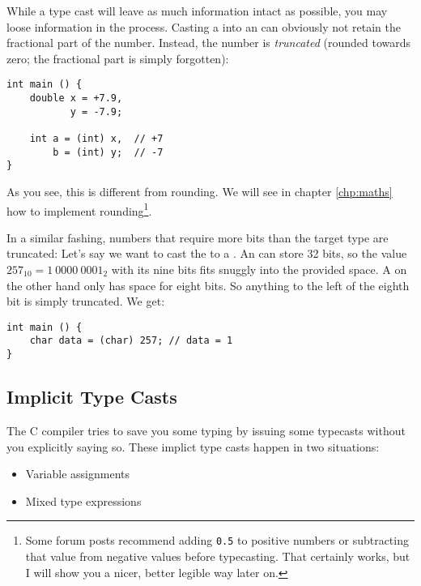 {While a type cast will leave as much information intact as possible, you may loose information in the process. Casting a  into an  can obviously not retain the fractional part of the number. Instead, the number is \emph{truncated} (rounded towards zero; the fractional part is simply forgotten):

\begin{codebox}
\begin{verbatim}
int main () {
    double x = +7.9,
           y = -7.9;

    int a = (int) x,  // +7
        b = (int) y;  // -7
}
\end{verbatim}
\end{codebox}

As you see, this is different from rounding. We will see in chapter \ref{chp:maths} how to implement rounding\footnote{Some forum posts recommend adding \texttt{0.5} to positive numbers or subtracting that value from negative values before typecasting. That certainly works, but I will show you a nicer, better legible way later on.}.

In a similar fashing, numbers that require more bits than the target type are truncated: Let's say we want to cast the  to a . An  can store 32 bits, so the value $257_{10} = 1~0000~0001_2$ with its nine bits fits snuggly into the provided space. A  on the other hand only has space for eight bits. So anything to the left of the eighth bit is simply truncated. We get:

\begin{codebox}
\begin{verbatim}
int main () {
    char data = (char) 257; // data = 1
}
\end{verbatim}
\end{codebox}

\subsection{Implicit Type Casts}
The C compiler tries to save you some typing by issuing some typecasts without you explicitly saying so. These implict type casts happen in two situations:
\begin{itemize}
\item Variable assignments
\item Mixed type expressions
\end{itemize}

}
